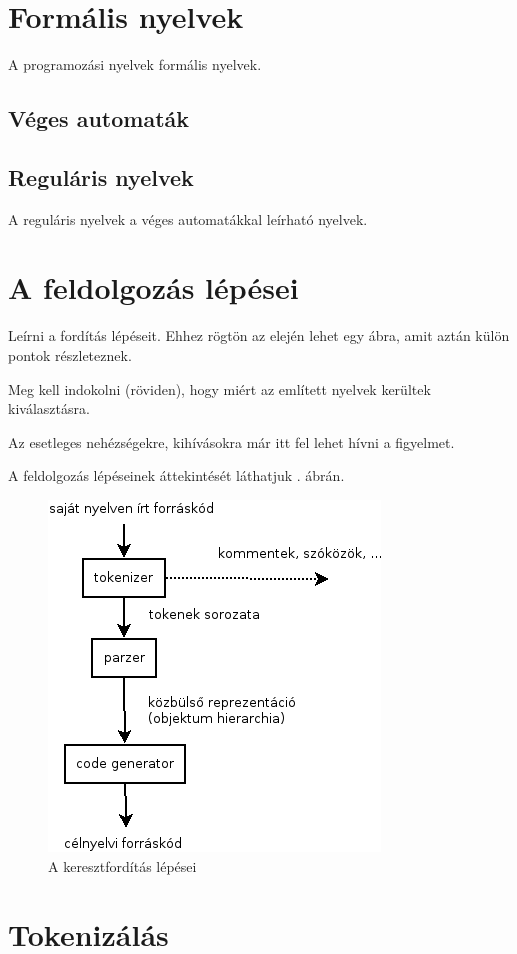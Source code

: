 
\section{Formális nyelvek}

A programozási nyelvek formális nyelvek.

\subsection{Véges automaták}


\subsection{Reguláris nyelvek}

A reguláris nyelvek a véges automatákkal leírható nyelvek.



\section{A feldolgozás lépései}

Leírni a fordítás lépéseit. Ehhez rögtön az elején lehet egy ábra, amit aztán külön pontok részleteznek.

Meg kell indokolni (röviden), hogy miért az említett nyelvek kerültek kiválasztásra.

Az esetleges nehézségekre, kihívásokra már itt fel lehet hívni a figyelmet.

A feldolgozás lépéseinek áttekintését láthatjuk . ábrán.

\begin{figure}
\centering
\includegraphics[scale=1]{kepek/process.png}
\caption{A keresztfordítás lépései}
\label{fig:process}
\end{figure}

\section{Tokenizálás}


